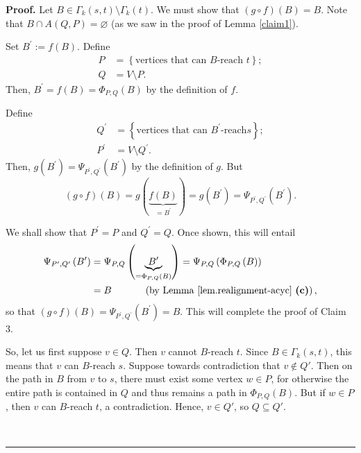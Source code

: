 \documentclass[numbers=enddot,12pt,final,onecolumn,notitlepage]{scrartcl}%
\theoremstyle{definition}
\newenvironment{proof}[1][Proof]{\noindent\textbf{#1.} }{\ \rule{0.5em}{0.5em}}
\theoremstyle{plainsl}
\begin{document}
\begin{proof}
    Let $B\in\Gamma_{k}\left(  s,t\right)  \setminus\Gamma
_{k}\left(  t\right)  $. We must show that $\left(  g\circ f\right)  \left(
B\right)  =B$. Note that $B\cap A\left(  Q,P\right)  =\varnothing$ (as we saw in the proof of
Lemma \ref{claim1}).

Set $B^{\prime}:=f\left(  B\right)  $. Define
\begin{align*}
P &  =\left\{  \text{vertices that can }B\text{-reach }t\right\}  ;\\
Q &  =V\setminus P.
\end{align*}
Then, $B^{\prime}=f\left(  B\right)  =\Phi_{P,Q}\left(  B\right)  $ by the
definition of $f$.

Define
\begin{align*}
Q^{\prime} &  =\left\{  \text{vertices that can }B^{\prime}\text{-reach
}s\right\}  ;\\
P^{\prime} &  =V\setminus Q^{\prime}.
\end{align*}
Then, $g\left(  B^{\prime}\right)  =\Psi_{P^{\prime},Q^{\prime}}\left(
B^{\prime}\right)  $ by the definition of $g$. But
\[
\left(  g\circ f\right)  \left(  B\right)  =g\left(  \underbrace{f\left(
B\right)  }_{=B^{\prime}}\right)  =g\left(  B^{\prime}\right)  =\Psi
_{P^{\prime},Q^{\prime}}\left(  B^{\prime}\right)  .
\]


We shall show that $P^{\prime}=P$ and $Q^{\prime}=Q$. Once shown, this will
entail
\begin{align*}
\Psi_{P^{\prime},Q^{\prime}}\left(  B^{\prime}\right)    & =\Psi_{P,Q}\left(
\underbrace{B^{\prime}}_{=\Phi_{P,Q}\left(  B\right)  }\right)  =\Psi
_{P,Q}\left(  \Phi_{P,Q}\left(  B\right)  \right)  \\
& =B\ \ \ \ \ \ \ \ \ \ \left(  \text{by Lemma \ref{lem.realignment-acyc}
\textbf{(c)}}\right)  ,
\end{align*}
so that $\left(  g\circ f\right)  \left(  B\right)  =\Psi_{P^{\prime
},Q^{\prime}}\left(  B^{\prime}\right)  =B$. This will complete the proof of
Claim 3.

So, let us first suppose $v \in Q$. Then $v$ cannot $B$-reach $t$. Since $B \in \Gamma_{k}(s,t)$, this means that $v$ can $B$-reach $s$. Suppose towards contradiction that $v \notin Q'$. Then on the  path in $B$ from $v$ to $s$, there must exist some vertex $w \in P$, for otherwise the entire path is contained in $Q$ and thus remains a path in $\Phi_{P,Q}(B)$. But if $w \in P$, then $v$ can $B$-reach $t$, a contradiction. Hence, $v \in Q'$, so $Q \subseteq Q'$.


\end{proof}
\end{document}
